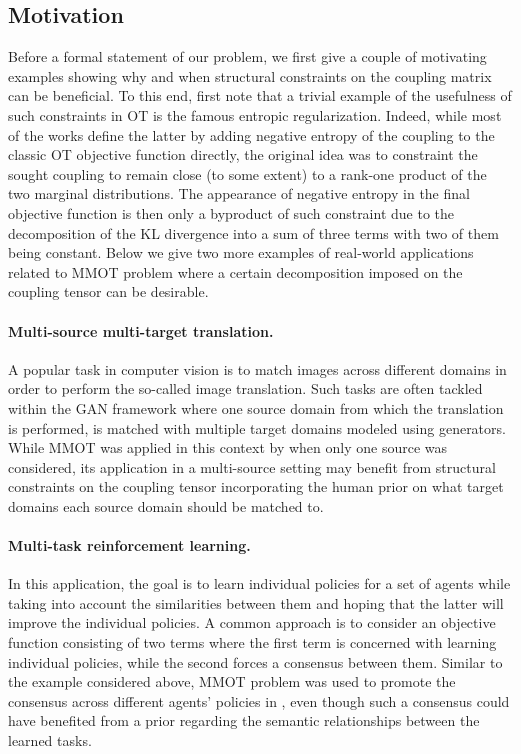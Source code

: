 \documentclass{article}
\begin{document}
\subsection{Motivation} 

Before a formal statement of our problem, we first give a couple of motivating examples showing why and when structural constraints on the coupling matrix can be beneficial. To this end, first note that a trivial example of the usefulness of such constraints in OT is the famous entropic regularization. Indeed, while most of the works define the latter by adding negative entropy of the coupling to the classic OT objective function directly, the original idea was to constraint the sought coupling to remain close (to some extent) to a rank-one product of the two marginal distributions. The appearance of negative entropy in the final objective function is then only a byproduct of such constraint due to the decomposition of the KL divergence into a sum of three terms with two of them being constant. Below we give two more examples of real-world applications related to MMOT problem where a certain decomposition imposed on the coupling tensor can be desirable. 
\paragraph{Multi-source multi-target translation.} A popular task in computer vision is to match images across different domains in order to perform the so-called image translation. Such tasks are often tackled within the GAN framework where one source domain from which the translation is performed, is matched with multiple target domains modeled using generators. While MMOT was applied in this context by \citet{Cao19} when only one source was considered, its application in a multi-source setting may benefit from structural constraints on the coupling tensor incorporating the human prior on what target domains each source domain should be matched to. 
\paragraph{Multi-task reinforcement learning.} In this application, the goal is to learn individual policies for a set of agents while taking into account the similarities between them and hoping that the latter will improve the individual policies. A common approach is to consider an objective function consisting of two terms where the first term is concerned with learning individual policies, while the second forces a consensus between them. Similar to the example considered above, MMOT problem was used to promote the consensus across different agents' policies in \citep{Cohen21}, even though such a consensus could have benefited from a prior regarding the semantic relationships between the learned tasks. 
%
\end{document}
